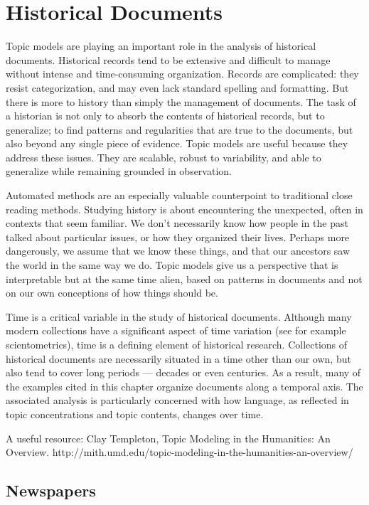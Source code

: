 
\chapter{Historical Documents}
\label{ch:nonfiction}

Topic models are playing an important role in the analysis of historical documents.
Historical records tend to be extensive and difficult to manage without intense and time-consuming organization.
Records are complicated: they resist categorization, and may even lack standard spelling and formatting.
But there is more to history than simply the management of documents.
The task of a historian is not only to absorb the contents of historical records, but to generalize; to find patterns and regularities that are true to the documents, but also beyond any single piece of evidence.
Topic models are useful because they address these issues. They are scalable, robust to variability, and able to generalize while remaining grounded in observation.

Automated methods are an especially valuable counterpoint to traditional close reading methods.
Studying history is about encountering the unexpected, often in contexts that seem familiar.
We don't necessarily know how people in the past talked about particular issues, or how they organized their lives.
Perhaps more dangerously, we assume that we know these things, and that our ancestors saw the world in the same way we do.
Topic models give us a perspective that is interpretable but at the same time alien, based on patterns in documents and not on our own conceptions of how things should be.

Time is a critical variable in the study of historical documents.
Although many modern collections have a significant aspect of time variation (see for example scientometrics), time is a defining element of historical research.
Collections of historical documents are necessarily situated in a time other than our own, but also tend to cover long periods --- decades or even centuries.
As a result, many of the examples cited in this chapter organize documents along a temporal axis.
The associated analysis is particularly concerned with how language, as reflected in topic concentrations and topic contents, changes over time.

A useful resource:
Clay Templeton, Topic Modeling in the Humanities: An Overview.
http://mith.umd.edu/topic-modeling-in-the-humanities-an-overview/

\section{Newspapers}

